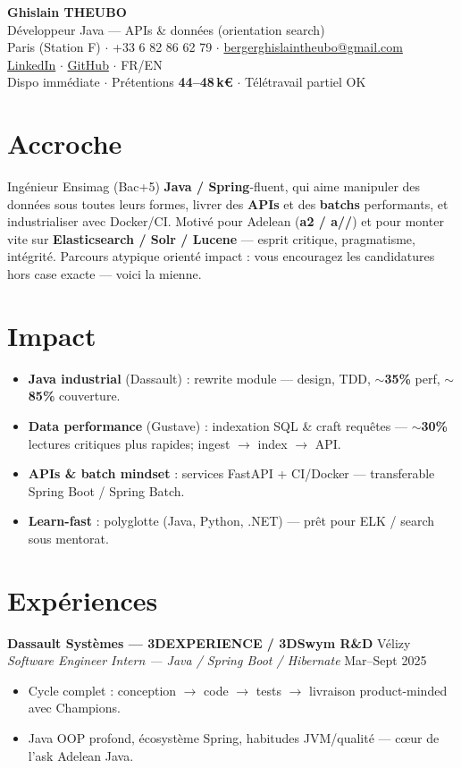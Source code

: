 \documentclass[10pt,a4paper]{article}
\begin{document}
\begin{center}
{\LARGE\bfseries Ghislain THEUBO}\\[1pt]
{\large D\'eveloppeur Java --- APIs \& donn\'ees (orientation search)}\\[2pt]
Paris (Station F) $\cdot$ +33 6 82 86 62 79 $\cdot$ \href{mailto:bergerghislaintheubo@gmail.com}{bergerghislaintheubo@gmail.com}\\
\href{https://www.linkedin.com/in/berger-ghislain}{LinkedIn} $\cdot$ \href{https://github.com/Bergerghislain}{GitHub} $\cdot$ FR/EN\\
\small Dispo imm\'ediate $\cdot$ Pr\'etentions \textbf{44--48\,k€} $\cdot$ T\'el\'etravail partiel OK
\end{center}

\section{Accroche}
Ing\'enieur Ensimag (Bac+5) \textbf{Java / Spring}-fluent, qui aime manipuler des donn\'ees sous toutes leurs formes, livrer des \textbf{APIs} et des \textbf{batchs} performants, et industrialiser avec Docker/CI. Motiv\'e pour Adelean (\textbf{a2 / a//}) et pour monter vite sur \textbf{Elasticsearch / Solr / Lucene} --- esprit critique, pragmatisme, int\'egrit\'e. Parcours atypique orient\'e impact : vous encouragez les candidatures hors case exacte --- voici la mienne.

\section{Impact}
\begin{itemize}
  \item \textbf{Java industrial} (Dassault) : rewrite module --- design, TDD, \textbf{$\sim$35\%} perf, \textbf{$\sim$85\%} couverture.
  \item \textbf{Data performance} (Gustave) : indexation SQL \& craft requ\^etes --- \textbf{$\sim$30\%} lectures critiques plus rapides; ingest $\rightarrow$ index $\rightarrow$ API.
  \item \textbf{APIs \& batch mindset} : services FastAPI + CI/Docker --- transferable Spring Boot / Spring Batch.
  \item \textbf{Learn-fast} : polyglotte (Java, Python, .NET) --- pr\^et pour ELK / search sous mentorat.
\end{itemize}

\section{Exp\'eriences}
\textbf{Dassault Syst\`emes --- 3DEXPERIENCE / 3DSwym R\&D} \hfill V\'elizy\\
\textit{Software Engineer Intern --- Java / Spring Boot / Hibernate} \hfill Mar--Sept 2025
\begin{itemize}
  \item Cycle complet : conception $\rightarrow$ code $\rightarrow$ tests $\rightarrow$ livraison product-minded avec Champions.
  \item Java OOP profond, \'ecosyst\`eme Spring, habitudes JVM/qualit\'e --- c\oe ur de l'ask Adelean Java.
\end{itemize}
\end{document}
